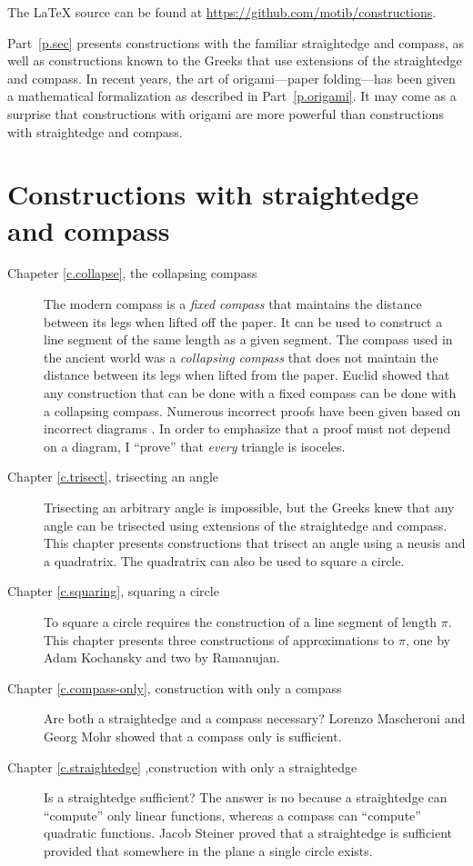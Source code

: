 The \LaTeX{} source can be found at \url{https://github.com/motib/constructions}.

Part~\ref{p.sec} presents constructions with the familiar straightedge and compass, as well as constructions known to the Greeks that use extensions of the straightedge and compass. In recent years, the art of origami---paper folding---has been given a mathematical formalization as described in Part~\ref{p.origami}. It may come as a surprise that constructions with origami are more powerful than constructions with straightedge and compass.

\section{Constructions with straightedge and compass}

\begin{description}
\item[Chapeter \ref{c.collapse}, the collapsing compass] The modern compass is a \emph{fixed compass} that maintains the distance between its legs when lifted off the paper. It can be used to construct a line segment of the same length as a given segment. The compass used in the ancient world was a \emph{collapsing compass} that does not maintain the distance between its legs when lifted from the paper. Euclid showed that any construction that can be done with a fixed compass can be done with a collapsing compass. Numerous incorrect proofs have been given based on incorrect diagrams \cite{toussaint}. In order to emphasize that a proof must not depend on a diagram, I ``prove'' that \emph{every} triangle is isoceles.

\item[Chapter \ref{c.trisect}, trisecting an angle] Trisecting an arbitrary angle is impossible, but the Greeks knew that any angle can be trisected using extensions of the straightedge and compass. This chapter presents constructions that trisect an angle using a neusis and a quadratrix. The quadratrix can also be used to square a circle.

\item[Chapter \ref{c.squaring}, squaring a circle] To square a circle requires the construction of a line segment of length $\pi$. This chapter presents three constructions of approximations to $\pi$, one by Adam Kochansky and two by Ramanujan.

\item[Chapter \ref{c.compass-only}, construction with only a compass] Are both a straightedge and a compass necessary? Lorenzo Mascheroni and Georg Mohr showed that a compass only is sufficient. 

\item[Chapter \ref{c.straightedge} ,construction with only a straightedge] Is a straightedge sufficient? The answer is no because a straightedge can ``compute'' only linear functions, whereas a compass can ``compute'' quadratic functions. Jacob Steiner proved that a straightedge is sufficient provided that somewhere in the plane a single circle exists. 
\end{description}


